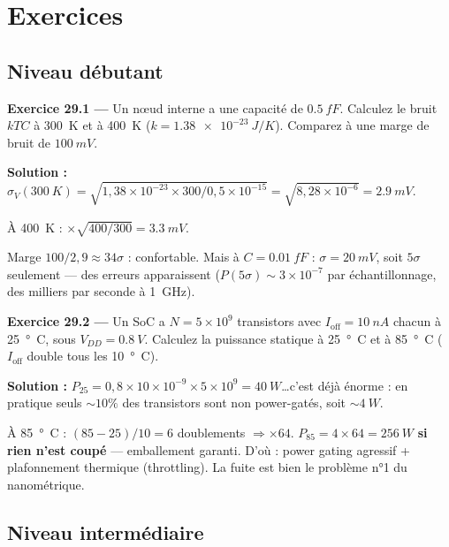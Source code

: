 \documentclass[12pt,a4paper,twoside]{book}
\begin{document}
\section*{Exercices}

\subsection*{Niveau débutant}

\textbf{Exercice 29.1 ---} Un nœud interne a une capacité de $\SI{0.5}{fF}$. Calculez le bruit $kTC$ à \SI{300}{K} et à \SI{400}{K} ($k = \SI{1.38e-23}{J/K}$). Comparez à une marge de bruit de $\SI{100}{mV}$.

\begin{pratique}
\textbf{Solution :} $\sigma_V(\SI{300}{K}) = \sqrt{1{,}38\times10^{-23}\times300/0{,}5\times10^{-15}} = \sqrt{8{,}28\times10^{-6}} = \SI{2.9}{mV}$.

À \SI{400}{K} : $\times\sqrt{400/300} = \SI{3.3}{mV}$.

Marge $100/2{,}9 \approx 34\sigma$ : confortable. Mais à $C = \SI{0.01}{fF}$ : $\sigma = \SI{20}{mV}$, soit $5\sigma$ seulement --- des erreurs apparaissent ($P(5\sigma) \sim 3\times10^{-7}$ par échantillonnage, des milliers par seconde à \SI{1}{GHz}).
\end{pratique}

\textbf{Exercice 29.2 ---} Un SoC a $N = 5\times10^9$ transistors avec $I_{\text{off}} = \SI{10}{nA}$ chacun à \SI{25}{°C}, sous $V_{DD} = \SI{0.8}{V}$. Calculez la puissance statique à \SI{25}{°C} et à \SI{85}{°C} ($I_{\text{off}}$ double tous les \SI{10}{°C}).

\begin{pratique}
\textbf{Solution :} $P_{25} = 0{,}8 \times 10\times10^{-9} \times 5\times10^9 = \SI{40}{W}$\ldots c'est déjà énorme : en pratique seuls $\sim 10\%$ des transistors sont non power-gatés, soit $\sim\SI{4}{W}$.

À \SI{85}{°C} : $(85-25)/10 = 6$ doublements $\Rightarrow \times 64$. $P_{85} = 4 \times 64 = \SI{256}{W}$ \textbf{si rien n'est coupé} --- emballement garanti. D'où : power gating agressif + plafonnement thermique (throttling). La fuite est bien le problème n°1 du nanométrique.
\end{pratique}

\subsection*{Niveau intermédiaire}
\end{document}
